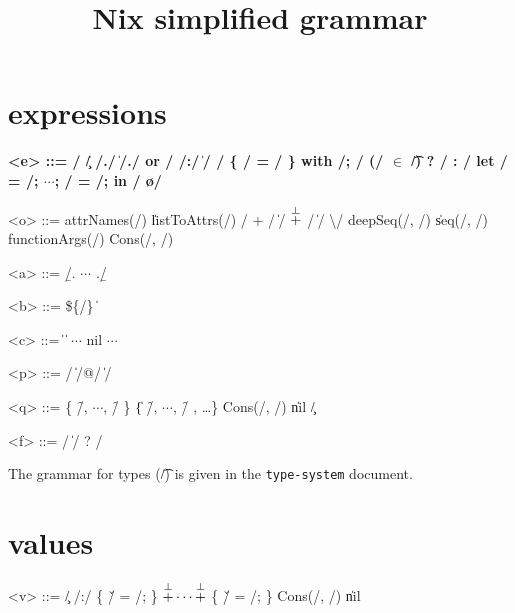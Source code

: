 

\title{Nix simplified grammar}


\maketitle{}

\section{expressions}

\begin{grammar}
  \bfseries
  <e> ::=
    \x/ \| \c/
    \alt \e/.\a/ \| \e/.\a/ or \e/
    \alt \p/:\e/ \| \e/ \e/
    \alt \{ \e/ = \e/ \}
    \alt with \e/; \e/
    \alt (\e/ $\bm{\in}$ \t/) ? \e/ : \e/
    \alt let \x/ = \e/; $\cdots{}$; \x/ = \e/; in \e/
    \alt \o/

    <o> ::= attrNames(\e/) \| listToAttrs(\e/)
    \alt \e/ + \e/ \| \e/ $\overset{\bot}{+}$ \e/ \| \e/ \textbackslash \e/
    \alt deepSeq(\e/, \e/) \| seq(\e/, \e/)
    \alt functionArgs(\e/)
    \alt Cons(\e/, \e/)

  <a> ::= \b/. $\cdots{}$ .\b/

  <b> ::= \$\{\e/\} \| 

  <c> ::=  \|  \| $\cdots{}$
    \alt nil
    \alt $\cdots{}$

  <p> ::= \q/ \| \q/@\x/ \| \x/

  <q> ::= \{ \f/, $\cdots{}$, \f/ \} \| \{ \f/, $\cdots{}$, \f/ , \ldots{}\}
    \alt Cons(\x/, \x/) \| nil
    \alt \c/

  <f> ::= \x/ \| \x/ ? \e/

\end{grammar}

The grammar for types (\t/) is given in the \texttt{type-system} document.


\section{values}

\begin{grammar}
  \bfseries

  <v> ::=
    \c/
    \alt \p/:\e/
    \alt \{ \v/ = \e/; \} $\overset{\bot}{+} \cdots{} \overset{\bot}{+}$ \{ \v/ = \e/; \}
    \alt Cons(\e/, \e/) \| nil
\end{grammar}

